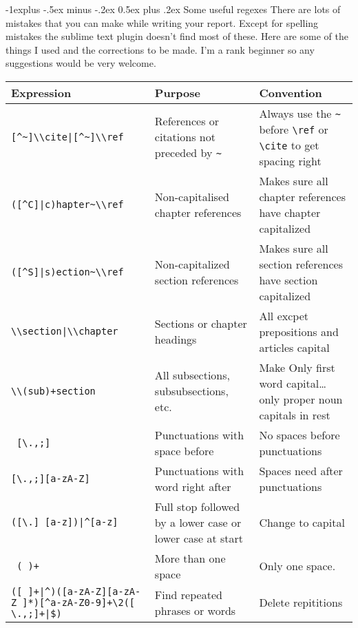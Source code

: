 \documentclass[12pt,landscape]{article}
\makeatletter
\renewcommand{\section}{\@startsection{section}{1}{0mm}%
                                {-1ex plus -.5ex minus -.2ex}%
                                {0.5ex plus .2ex}%
                                {\normalfont\large\bfseries}}
\renewcommand{\subsection}{\@startsection{subsection}{2}{0mm}%
                                {-1explus -.5ex minus -.2ex}%
                                {0.5ex plus .2ex}%
                                {\normalfont\normalsize\bfseries}}
\makeatother
\begin{document}
\subsection{Some useful regexes}
There are lots of mistakes that you can make while writing your report. Except for spelling mistakes the sublime text plugin doesn't find most of these.  Here are some of the things I used and the corrections to be made. I'm a rank beginner so any suggestions would be very welcome.
\\
\vspace{0.25in}
\begin{tabular}{p{4in}  p{2.5in}  p{3in}}
\hline\hline %
Expression                      & Purpose                                       & Convention \\
\hline
\verb![^~]\\cite|[^~]\\ref!       & References or citations not preceded by \verb!~!     & Always use the \verb!~! before \verb!\ref! or \verb!\cite! to get spacing right \\
\verb!([^C]|c)hapter~\\ref!       & Non-capitalised chapter references            & Makes sure all chapter references have chapter capitalized \\
\verb!([^S]|s)ection~\\ref!      & Non-capitalized section references            & Makes sure all section references have section capitalized \\
\verb!\\section|\\chapter!      & Sections or chapter headings                  & All excpet prepositions and articles capital \\
\verb!\\(sub)+section!          & All subsections, subsubsections, etc.         & Make Only first word capital…  only proper noun capitals in rest \\
\verb! [\.,;]!                  & Punctuations with space before                & No spaces before punctuations \\
\verb![\.,;][a-zA-Z]!           & Punctuations with word right after            & Spaces need after punctuations \\
\verb!([\.] [a-z])|^[a-z]!      & Full stop followed by a lower case or lower case at start & Change to capital \\
\verb! ( )+!                    & More than one space                           & Only one space. \\
\verb!([ ]+|^)([a-zA-Z][a-zA-Z ]*)[^a-zA-Z0-9]+\2([ \.,;]+|$)! & Find repeated phrases or words & Delete repititions
\end{tabular}
\vspace{0.25in}
\end{document}
